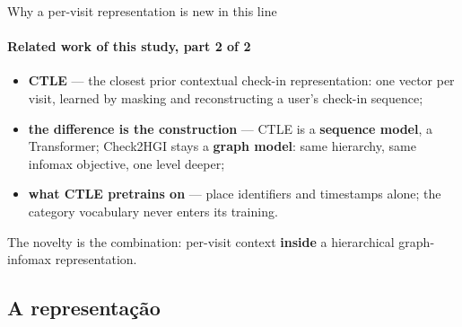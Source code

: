 \documentclass{beamer}
\begin{document}
\begin{frame}{Why a per-visit representation is new in this line}
    \framesubtitle{Related work of this study, part 2 of 2}

    \begin{itemize}\setlength{\itemsep}{5pt}
        \item \textbf{CTLE} --- the closest prior contextual check-in representation: one vector
              per visit, learned by masking and reconstructing a user's check-in sequence;
        \item \textbf{the difference is the construction} --- CTLE is a \textbf{sequence model},
              a Transformer; Check2HGI stays a \textbf{graph model}: same hierarchy, same infomax
              objective, \alert{one level deeper};
        \item \textbf{what CTLE pretrains on} --- place identifiers and timestamps alone; the
              category vocabulary never enters its training.
    \end{itemize}

    \bigskip
    \begin{block}{}
        \small
        \alert{The novelty is the combination:} per-visit context \textbf{inside} a hierarchical
        graph-infomax representation.
    \end{block}
\end{frame}

\subsection{A representação}
\end{document}
